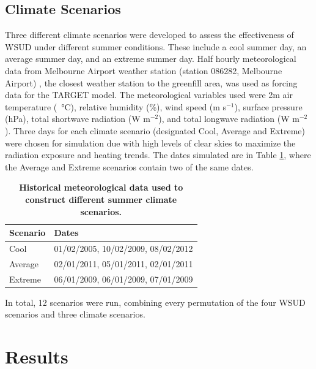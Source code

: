 \documentclass[final,3p,times,authoryear]{elsarticle}
\begin{document}
\subsection{Climate Scenarios}\label{sec:methods_climate_scenarios}

Three different climate scenarios were developed to assess the effectiveness of WSUD under different summer conditions. These include a cool summer day, an average summer day, and an extreme summer day. Half hourly meteorological data from Melbourne Airport weather station (station 086282, Melbourne Airport) \citep{BOM2016b}, the closest weather station to the greenfill area, was used as forcing data for the TARGET model. The meteorological variables used were 2m air temperature (\SI{}{\degreeCelsius}), relative humidity (\%), wind speed (m s$^{-1}$), surface pressure (hPa), total shortwave radiation (W m$^{-2}$), and total longwave radiation (W m$^{-2}$). Three days for each climate scenario (designated Cool, Average and Extreme) were chosen for simulation due with high levels of clear skies to maximize the radiation exposure and heating trends. The dates simulated are in Table \ref{tab:dates}, where the Average and Extreme scenarios contain two of the same dates.

\begin{table}[!htbp]
\caption{\bf Historical meteorological data used to construct different summer climate scenarios.  \label{tab:dates}}     
\begin{tabular}{ l l}
\textbf{Scenario} & \textbf{Dates}\\ \hline
Cool & 01/02/2005, 10/02/2009, 08/02/2012 \\ 
Average & 02/01/2011, 05/01/2011, 02/01/2011 \\ 
Extreme & 06/01/2009, 06/01/2009, 07/01/2009 \\ 
\hline
\end{tabular}
\end{table}

In total, 12 scenarios were run, combining every permutation of the four WSUD scenarios and three climate scenarios.


%

\section{Results}
\end{document}
